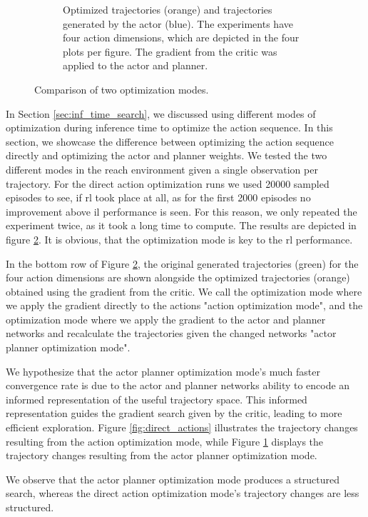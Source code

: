 \begin{figure}[htbp]
\begin{subfigure}{0.48\textwidth}
    \caption{Optimized trajectories (orange) and trajectories generated by the actor (blue). 
    The experiments have four action dimensions, which are depicted in the 
    four plots per figure. The gradient from the critic was applied to the actor and planner.}
    \label{fig:ac_pl_actions}
  \end{subfigure}
  \caption{Comparison of two optimization modes.}
  \label{fig:action_vs_actor}
\end{figure}

In Section \ref{sec:inf_time_search}, we discussed using different modes of optimization during inference time to optimize the action sequence. In this section, 
we showcase the difference between optimizing the action sequence directly and optimizing the actor and planner weights. We tested the two different 
modes in the reach environment given a single observation per trajectory. For the direct 
action optimization runs we used 20000 sampled episodes to see, if \ac{rl} took place at all, as for the first 2000 episodes no improvement above 
\ac{il} performance is seen. For this reason, we only repeated the experiment twice, as it took a long time to compute. The results are depicted in figure 
\ref{fig:action_vs_actor}. It is obvious, that the optimization mode is key to the \ac{rl} performance. 


In the bottom row of Figure \ref{fig:action_vs_actor}, the original generated trajectories (green) for the four action dimensions 
are shown alongside the optimized trajectories (orange) obtained using the gradient from the critic. We call the optimization mode 
where we apply the gradient directly to the actions "action optimization mode", and the optimization mode where we apply 
the gradient to the actor and planner networks and recalculate the trajectories given the changed networks "actor planner 
optimization mode".

We hypothesize that 
the actor planner optimization mode's much faster convergence rate is due to the actor and planner networks ability to 
encode an informed representation of the useful trajectory space. This informed representation guides the gradient search 
given by the critic, leading to more efficient exploration. Figure \ref{fig:direct_actions} illustrates the trajectory 
changes resulting from the action optimization mode, while Figure \ref{fig:ac_pl_actions} displays 
the trajectory changes resulting from the actor planner optimization mode.

We observe that the actor planner 
optimization mode produces a structured search, whereas the direct action optimization mode's trajectory changes are less structured.

